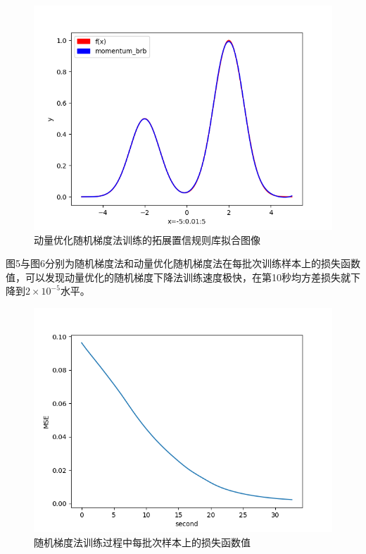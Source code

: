 \documentclass{cjc}
\begin{document}
\begin{figure}
    \includegraphics[width=\linewidth]{momentum_brb_fit.png}
    \caption{动量优化随机梯度法训练的拓展置信规则库拟合图像}
\end{figure}

图5与图6分别为随机梯度法和动量优化随机梯度法在每批次训练样本上的损失函数值，可以发现动量优化的随机梯度下降法训练速度极快，在第10秒均方差损失就下降到$2\times10^{-5}$水平。
\begin{figure}
    \includegraphics[width=\linewidth]{sgd_loss.png}
    \caption{随机梯度法训练过程中每批次样本上的损失函数值}
\end{figure}
\end{document}
